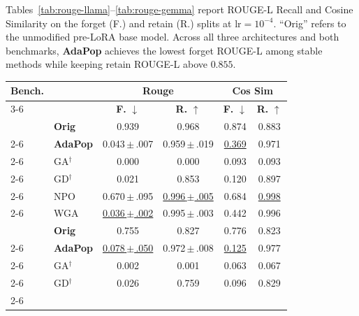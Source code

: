 Tables~\ref{tab:rouge-llama}--\ref{tab:rouge-gemma} report ROUGE-L Recall and Cosine Similarity on the forget (F.) and retain (R.) splits at $\text{lr}=10^{-4}$. ``Orig'' refers to the unmodified pre-LoRA base model. Across all three architectures and both benchmarks, \textbf{AdaPop} achieves the lowest forget ROUGE-L among stable methods while keeping retain ROUGE-L above $0.855$.

\begin{table}[ht]
\centering
\footnotesize
\setlength{\tabcolsep}{2.5pt}
\begin{tabularx}{\linewidth}{|l|>{\centering\arraybackslash}X|c|c|c|c|}
\hline
\multirow{2}{*}{\textbf{Bench.}} & \multirow{2}{*}{\textbf{Algorithm}} & \multicolumn{2}{c|}{\textbf{Rouge}} & \multicolumn{2}{c|}{\textbf{Cos Sim}} \\ \cline{3-6}
 & & \textbf{F.} $\downarrow$ & \textbf{R.} $\uparrow$ & \textbf{F.} $\downarrow$ & \textbf{R.} $\uparrow$ \\ \hline
\rowcolor{cyan!15} \cellcolor{white} & \textbf{Orig} & 0.939 & 0.968 & 0.874 & 0.883 \\ \cline{2-6}
\rowcolor{violet!15} \cellcolor{white} & \textbf{AdaPop} & 0.043{\tiny\,$\pm$\,.007} & 0.959{\tiny\,$\pm$\,.019} & \underline{0.369} & 0.971 \\ \cline{2-6}
\rowcolor{gray!10} \cellcolor{white} & GA$^\dag$ & 0.000 & 0.000 & 0.093 & 0.093 \\ \cline{2-6}
\cellcolor{white} & GD$^\dag$ & 0.021 & 0.853 & 0.120 & 0.897 \\ \cline{2-6}
\rowcolor{gray!10} \cellcolor{white} & NPO & 0.670{\tiny\,$\pm$\,.095} & \underline{0.996{\tiny\,$\pm$\,.005}} & 0.684 & \underline{0.998} \\ \cline{2-6}
\multirow{-6}{*}{\textbf{DUET}} \cellcolor{white} & WGA & \underline{0.036{\tiny\,$\pm$\,.002}} & 0.995{\tiny\,$\pm$\,.003} & 0.442 & 0.996 \\ \hline
\rowcolor{cyan!15} \cellcolor{white} & \textbf{Orig} & 0.755 & 0.827 & 0.776 & 0.823 \\ \cline{2-6}
\rowcolor{violet!15} \cellcolor{white} & \textbf{AdaPop} & \underline{0.078{\tiny\,$\pm$\,.050}} & 0.972{\tiny\,$\pm$\,.008} & \underline{0.125} & 0.977 \\ \cline{2-6}
\rowcolor{gray!10} \cellcolor{white} & GA$^\dag$ & 0.002 & 0.001 & 0.063 & 0.067 \\ \cline{2-6}
\cellcolor{white} & GD$^\dag$ & 0.026 & 0.759 & 0.096 & 0.829 \\ \cline{2-6}

\end{tabularx}
\end{table}
